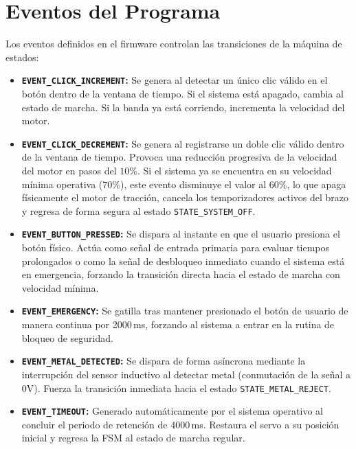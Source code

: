 \documentclass[12pt, letterpaper]{article}
\begin{document}
\section{Eventos del Programa}
\label{sec:eventos_preliminares}

Los eventos definidos en el firmware controlan las transiciones de la máquina de estados:

\begin{itemize}
    \item \textbf{\texttt{EVENT\_CLICK\_INCREMENT}:} Se genera al detectar un único clic válido en el botón dentro de la ventana de tiempo. Si el sistema está apagado, cambia al estado de marcha. Si la banda ya está corriendo, incrementa la velocidad del motor.
    
    \item \textbf{\texttt{EVENT\_CLICK\_DECREMENT}:} Se genera al registrarse un doble clic válido dentro de la ventana de tiempo. Provoca una reducción progresiva de la velocidad del motor en pasos del $10\%$. Si el sistema ya se encuentra en su velocidad mínima operativa ($70\%$), este evento disminuye el valor al $60\%$, lo que apaga físicamente el motor de tracción, cancela los temporizadores activos del brazo y regresa de forma segura al estado \texttt{STATE\_SYSTEM\_OFF}.
    
    \item \textbf{\texttt{EVENT\_BUTTON\_PRESSED}:} Se dispara al instante en que el usuario presiona el botón físico. Actúa como señal de entrada primaria para evaluar tiempos prolongados o como la señal de desbloqueo inmediato cuando el sistema está en emergencia, forzando la transición directa hacia el estado de marcha con velocidad mínima.
    
    \item \textbf{\texttt{EVENT\_EMERGENCY}:} Se gatilla tras mantener presionado el botón de usuario de manera continua por 2000\,ms, forzando al sistema a entrar en la rutina de bloqueo de seguridad.
    
    \item \textbf{\texttt{EVENT\_METAL\_DETECTED}:} Se dispara de forma asíncrona mediante la interrupción del sensor inductivo al detectar metal (conmutación de la señal a 0V). Fuerza la transición inmediata hacia el estado \texttt{STATE\_METAL\_REJECT}.
    
    \item \textbf{\texttt{EVENT\_TIMEOUT}:} Generado automáticamente por el sistema operativo al concluir el periodo de retención de 4000\,ms. Restaura el servo a su posición inicial y regresa la FSM al estado de marcha regular.
\end{itemize}
\end{document}

